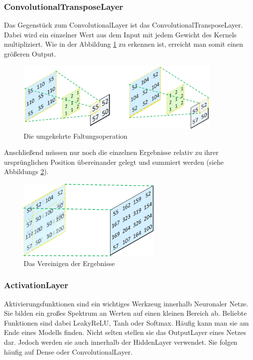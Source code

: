 \subsubsection{ConvolutionalTransposeLayer}

Das Gegenstück zum ConvolutionalLayer ist das ConvolutionalTransposeLayer.
Dabei wird ein einzelner Wert aus dem Input mit jedem Gewicht des Kernels multipliziert.
Wie in der Abbildung \ref{img:convelutional_transpose_layer} zu erkennen ist, erreicht man somit einen größeren Output.

\begin{figure}[H]
	\centering
	\includegraphics[width=10cm]{kapitel/2_stand_der_technik/img/convolutional_transpose_layer_cut.png}
	\caption[Die umgekehrte Faltungsoperation]{Die umgekehrte Faltungsoperation \cite{convolutional_transpose}}
	\label{img:convelutional_transpose_layer}
\end{figure}

Anschließend müssen nur noch die einzelnen Ergebnisse relativ zu ihrer ursprünglichen Position übereinander gelegt und summiert werden (siehe Abbildungs \ref{img:convelutional_transpose_layer_final}).

\begin{figure}[H]
	\centering
	\includegraphics[width=7cm]{kapitel/2_stand_der_technik/img/convolutional_transpose_layer_final.png}
	\caption[Das Vereinigen der Ergebnisse]{Das Vereinigen der Ergebnisse \cite{convolutional_transpose}}
	\label{img:convelutional_transpose_layer_final}
\end{figure}


\subsubsection{ActivationLayer}
Aktivierungsfunktionen sind ein wichtiges Werkzeug innerhalb Neuronaler Netze.
Sie bilden ein großes Spektrum an Werten auf einen kleinen Bereich ab.
Beliebte Funktionen sind dabei LeakyReLU, Tanh oder Softmax.
Häufig kann man sie am Ende eines Modells finden.
Nicht selten stellen sie das OutputLayer eines Netzes dar.
Jedoch werden sie auch innerhalb der HiddenLayer verwendet.
Sie folgen häufig auf Dense oder ConvolutionalLayer.

